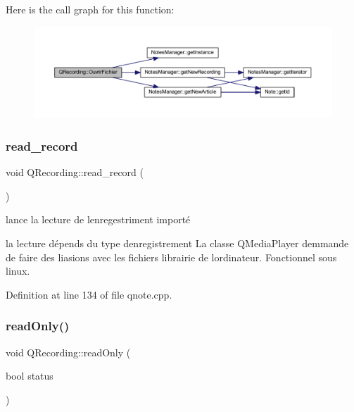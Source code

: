 Here is the call graph for this function\+:\nopagebreak
\begin{figure}[H]
\begin{center}
\leavevmode
\includegraphics[width=350pt]{class_q_recording_a9eaf976da6c3c768d15a5e53f3982753_cgraph}
\end{center}
\end{figure}
\mbox{\label{class_q_recording_a5c5c221fed1648c1813da1f195e26663}} 
\subsubsection{\texorpdfstring{read\+\_\+record}{read\_record}}
{\footnotesize\ttfamily void Q\+Recording\+::read\+\_\+record (\begin{DoxyParamCaption}{ }\end{DoxyParamCaption})\hspace{0.3cm}{\ttfamily [slot]}}



lance la lecture de l\textquotesingle{}enregestriment importé 

la lecture dépends du type d\textquotesingle{}enregistrement La classe Q\+Media\+Player demmande de faire des liasions avec les fichiers librairie de l\textquotesingle{}ordinateur. Fonctionnel sous linux. 

Definition at line 134 of file qnote.\+cpp.

\mbox{\label{class_q_recording_a98fa21d8814450c0d912c8ce102ca832}} 
\subsubsection{\texorpdfstring{read\+Only()}{readOnly()}}
{\footnotesize\ttfamily void Q\+Recording\+::read\+Only (\begin{DoxyParamCaption}\item[{bool}]{status }\end{DoxyParamCaption})\hspace{0.3cm}{\ttfamily [virtual]}}



